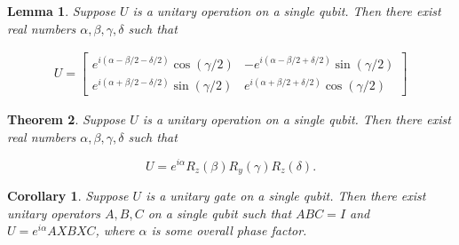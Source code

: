 \documentclass[11pt]{article}
\newcommand\0{\mathbf{0}}
\newcommand\<{\langle}
\renewcommand\>{\rangle}
\newtheorem{theorem}{Theorem}[section]
\newtheorem{corollary}{Corollary}[theorem]
\newtheorem{lemma}[theorem]{Lemma}
\begin{document}

\begin{lemma}\label{4.12}
Suppose $U$ is a unitary operation on a single qubit. Then there exist real numbers $\alpha, \beta, \gamma, \delta$ such that

\begin{align*}
	U = \begin{bmatrix}
 	e^{i(\alpha - \beta / 2 - \delta / 2)} \cos ( \gamma / 2) & -e^{i (\alpha - \beta /2 + \delta / 2)} \sin(\gamma / 2) \\ 
 	e^{i(\alpha + \beta / 2 - \delta / 2)} \sin ( \gamma / 2) & e^{i (\alpha + \beta /2 + \delta / 2)} \cos(\gamma / 2)
 \end{bmatrix}
\end{align*}
\end{lemma}

\begin{theorem}
Suppose $U$ is a unitary operation on a single qubit. Then there exist real numbers $\alpha, \beta, \gamma, \delta$ such that

$$
U = e^{i\alpha}R_z(\beta)R_y(\gamma)R_z(\delta).
$$	
\end{theorem}

\begin{corollary}\label{4.2}
	Suppose $U$ is a unitary gate on a single qubit. Then there exist unitary operators $A, B, C$ on a single qubit such that $ABC = I$ and $U = e^{i\alpha}AXBXC$, where $\alpha$ is some overall phase factor.
\end{corollary}
\end{document}
